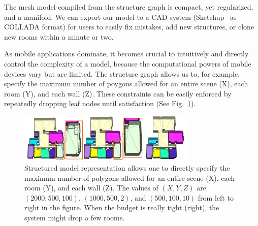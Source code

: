  The mesh model compiled from the structure
graph is compact, yet regularized, and a manifold. We can export our
model to a CAD system (\eg Sketchup~\cite{sketchup} as COLLADA format)
for users to easily fix mistakes, add new structures, or clone new rooms
within a minute or two.

 As mobile applications
dominate, it becomes crucial to intuitively and directly control the
complexity of a model, because the computational powers of mobile
devices vary but are limited.
The structure graph allows us to,
for example, specify the maximum number of poygons allowed for an entire
scene (X), each room (Y), and each wall (Z). These constraints can be
easily enforced by repeatedly dropping leaf nodes until satisfaction
(See Fig.~\ref{fig:complexity_control}).
\begin{figure}[!t]
\begin{center}
\includegraphics[width=85mm]{../figures/complexity2.pdf}
\end{center}
 \vspace{-0.2cm}
\caption{Structured model representation allows one to
 directly specify the
 maximum number of polygons allowed for an entire scene (X), each room
 (Y), and each wall (Z). The values of $(X,Y,Z)$ are $(2000,500,100)$,
 $(1000, 500, 2)$, and $(500, 100, 10)$ from left to right in the figure.
 When the budget is really tight (right), the
 system might drop a few rooms. %
 }
\label{fig:complexity_control}
 \vspace{-0.25cm}
\end{figure}

